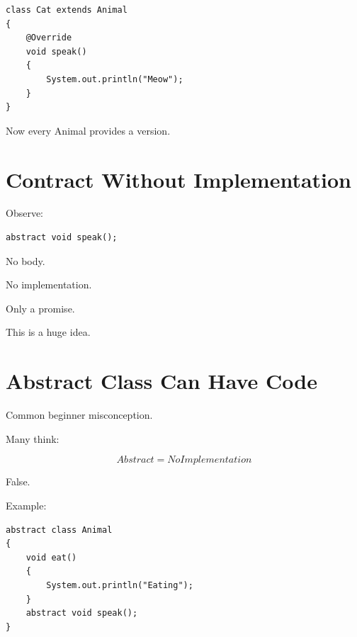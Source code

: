\documentclass[11pt,a4paper]{book}
\begin{document}

\begin{verbatim}
class Cat extends Animal
{
    @Override
    void speak()
    {
        System.out.println("Meow");
    }
}
\end{verbatim}


Now every Animal provides a version.


\section{Contract Without Implementation}

Observe:

\begin{verbatim}
abstract void speak();
\end{verbatim}


No body.

No implementation.


Only a promise.


This is a huge idea.


\section{Abstract Class Can Have Code}

Common beginner misconception.


Many think:

\[
Abstract
=
No Implementation
\]


False.


Example:

\begin{verbatim}
abstract class Animal
{
    void eat()
    {
        System.out.println("Eating");
    }
    abstract void speak();
}
\end{verbatim}
\end{document}
